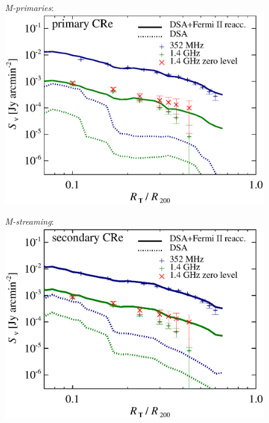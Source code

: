 \documentclass[fleqn,usenatbib,useAMS]{mnras}
\newcommand{\Mstream}{{\it M-streaming}\xspace}
\newcommand{\Mprimary}{{\it M-primaries}\xspace}
\begin{document}
\begin{figure}
\begin{minipage}{1\columnwidth}
   \begin{center}\Large{\Mprimary:}\\
     \includegraphics[width=\columnwidth]{sbright.nu.DIIcomp.Pri.g72a.Rad14.2400p.z0.NL.xKR.eb23.eI088.140.v6.eps}
   \end{center}
\end{minipage}
\begin{minipage}{1\columnwidth}
   \begin{center}\Large{\Mstream:}\\
     \includegraphics[width=\columnwidth]{sbright.nu.DIIcomp.flatCR.g72a.Rad14.2400p.z0.NL.xKR.eb23.eI082.flatCR.140.v6.eps}

\end{center}
\end{minipage}
\end{figure}
\end{document}
